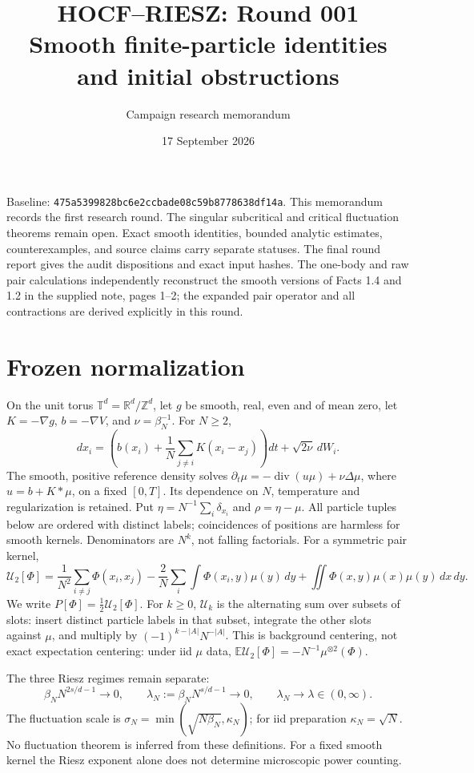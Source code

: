 \documentclass[11pt]{article}
\title{HOCF--RIESZ: Round 001\\Smooth finite-particle identities and initial obstructions}
\author{Campaign research memorandum}
\date{17 September 2026}
\newcommand{\T}{\mathbb T}
\newcommand{\U}{\mathcal U}
\newcommand{\E}{\mathbb E}
\begin{document}
\maketitle
\noindent Baseline: \texttt{475a5399828bc6e2ccbade08c59b8778638df14a}.
This memorandum records the first research round. The singular subcritical and
critical fluctuation theorems remain open. Exact smooth identities, bounded
analytic estimates, counterexamples, and source claims carry separate statuses.
The final round report gives the audit dispositions and exact input hashes.
The one-body and raw pair calculations independently reconstruct the smooth
versions of Facts 1.4 and 1.2 in the supplied note, pages 1--2; the expanded
pair operator and all contractions are derived explicitly in this round.

\section{Frozen normalization}
On the unit torus $\T^d=\mathbb R^d/\mathbb Z^d$, let $g$ be smooth,
real, even and of mean zero, let $K=-\nabla g$, $b=-\nabla V$, and
$\nu=\beta_N^{-1}$. For $N\ge2$,
\[
 dx_i=\left(b(x_i)+\frac1N\sum_{j\ne i}K(x_i-x_j)\right)dt
             +\sqrt{2\nu}\,dW_i.
\]
The smooth, positive reference density solves
$\partial_t\mu=-\operatorname{div}(u\mu)+\nu\Delta\mu$, where
$u=b+K*\mu$, on a fixed $[0,T]$. Its dependence on $N$, temperature
and regularization is retained. Put $\eta=N^{-1}\sum_i\delta_{x_i}$
and $\rho=\eta-\mu$.
All particle tuples below are ordered with distinct labels; coincidences
of positions are harmless for smooth kernels. Denominators are $N^k$,
not falling factorials. For a symmetric pair kernel,
\[
 \U_2[\Phi]=\frac1{N^2}\sum_{i\ne j}\Phi(x_i,x_j)
 -\frac2N\sum_i\int\Phi(x_i,y)\mu(y)\,dy
 +\iint\Phi(x,y)\mu(x)\mu(y)\,dx\,dy.
\]
We write $P[\Phi]=\tfrac12\U_2[\Phi]$. For $k\ge0$, $\U_k$ is the alternating sum over subsets of slots:
insert distinct particle labels in that subset, integrate the other slots
against $\mu$, and multiply by $(-1)^{k-|A|}N^{-|A|}$.
This is background centering, not exact expectation centering:
under iid $\mu$ data, $\E\U_2[\Phi]=-N^{-1}\mu^{\otimes2}(\Phi)$.

The three Riesz regimes remain separate:
\[
 \beta_NN^{2s/d-1}\to0,\qquad
 \lambda_N:=\beta_NN^{s/d-1}\to0,\qquad
 \lambda_N\to\lambda\in(0,\infty).
\]
The fluctuation scale is $\sigma_N=\min(\sqrt{N\beta_N},\kappa_N)$;
for iid preparation $\kappa_N=\sqrt N$. No fluctuation theorem is
inferred from these definitions. For a fixed smooth kernel the Riesz
exponent alone does not determine microscopic power counting.
\end{document}
